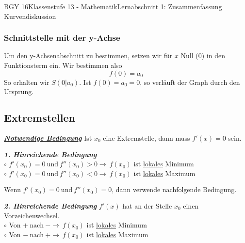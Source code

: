 \documentclass[11pt,twocolumn,oneside,openany,headings=optiontotoc,11pt,numbers=noenddot]{article}
\begin{document}
\begin{worksheet}{BGY 16}{Klassenstufe 13 - Mathematik}{Lernabschnitt 1: Zusammenfassung Kurvendiskussion}
		\subsubsection{Schnittstelle mit der y-Achse} Um den y-Achsenabschnitt zu bestimmen, setzen wir für \(x\) Null (\(0\)) in den Funktionsterm ein. Wir bestimmen also \[f(0) = a_0\]
		So erhalten wir \(S(0|a_0)\). Ist \(f(0) = a_0 = 0\), so verläuft der Graph durch den Ursprung.
		\subsection{Extremstellen} \underline{\textit{\textbf{Notwendige Bedingung}}} Ist \(x_0\) eine Extremstelle, dann muss \(f'(x) = 0\) sein.\\
		\par\noindent
		\textbf{\textit{1. Hinreichende Bedingung}}\\
		\(\circ\) \(f'(x_0)=0\ \text{und}\ f''(x_0) > 0 \rightarrow\ f(x_0)\) ist \underline{lokales} Minimum\\
		\(\circ\) \(f'(x_0)=0\ \text{und}\ f''(x_0) < 0 \rightarrow\ f(x_0)\) ist \underline{lokales} Maximum\\
		\par\noindent
		Wenn \(f'(x_0)=0\ \text{und}\ f''(x_0)=0\), dann verwende nachfolgende Bedingung.\\
		\par\noindent
		\textit{\textbf{2. Hinreichende Bedingung}} \(f'(x)\) hat an der Stelle \(x_0\) einen \underline{Vorzeichenwechsel}.\\
		\(\circ\) Von \(+\ \text{nach}\ - \rightarrow\ f(x_0)\) ist \underline{lokales} Minimum\\
		\(\circ\) Von \(-\ \text{nach}\ + \rightarrow\ f(x_0)\) ist \underline{lokales} Maximum\\

\end{worksheet}
\end{document}

